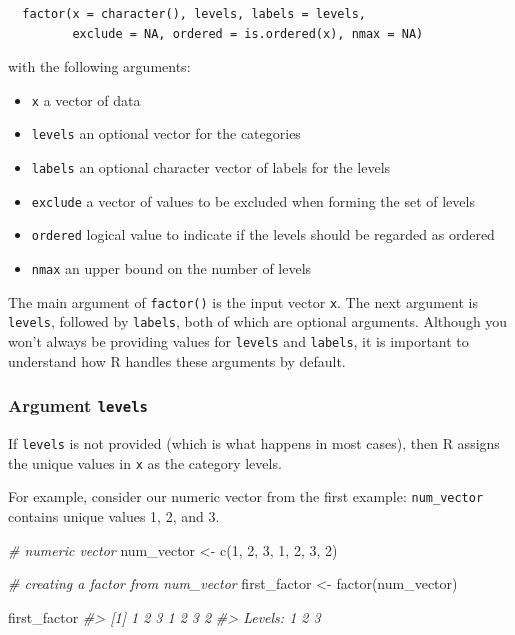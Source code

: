 \documentclass[
]{book}
\newenvironment{Shaded}{\begin{snugshade}}{\end{snugshade}}
\newcommand{\CommentTok}[1]{\textcolor[rgb]{0.56,0.35,0.01}{\textit{#1}}}
\newcommand{\DecValTok}[1]{\textcolor[rgb]{0.00,0.00,0.81}{#1}}
\newcommand{\FunctionTok}[1]{\textcolor[rgb]{0.00,0.00,0.00}{#1}}
\newcommand{\NormalTok}[1]{#1}
\newcommand{\OtherTok}[1]{\textcolor[rgb]{0.56,0.35,0.01}{#1}}
\providecommand{\tightlist}{%
  \setlength{\itemsep}{0pt}\setlength{\parskip}{0pt}}
\begin{document}
\begin{verbatim}
  factor(x = character(), levels, labels = levels,
         exclude = NA, ordered = is.ordered(x), nmax = NA)
\end{verbatim}

with the following arguments:

\begin{itemize}
\tightlist
\item
  \texttt{x} a vector of data
\item
  \texttt{levels} an optional vector for the categories
\item
  \texttt{labels} an optional character vector of labels for the levels
\item
  \texttt{exclude} a vector of values to be excluded when forming the set of levels
\item
  \texttt{ordered} logical value to indicate if the levels should be regarded as ordered
\item
  \texttt{nmax} an upper bound on the number of levels
\end{itemize}

The main argument of \texttt{factor()} is the input vector \texttt{x}. The next argument is
\texttt{levels}, followed by \texttt{labels}, both of which are optional arguments. Although
you won't always be providing values for \texttt{levels} and \texttt{labels}, it is important
to understand how R handles these arguments by default.

\hypertarget{argument-levels}{%
\subsubsection*{\texorpdfstring{Argument \texttt{levels}}{Argument levels}}\label{argument-levels}}

If \texttt{levels} is not provided (which is what happens in most cases), then R
assigns the unique values in \texttt{x} as the category levels.

For example, consider our numeric vector from the first example: \texttt{num\_vector}
contains unique values 1, 2, and 3.

\begin{Shaded}
\begin{Highlighting}[]
\CommentTok{\# numeric vector}
\NormalTok{num\_vector }\OtherTok{\textless{}{-}} \FunctionTok{c}\NormalTok{(}\DecValTok{1}\NormalTok{, }\DecValTok{2}\NormalTok{, }\DecValTok{3}\NormalTok{, }\DecValTok{1}\NormalTok{, }\DecValTok{2}\NormalTok{, }\DecValTok{3}\NormalTok{, }\DecValTok{2}\NormalTok{)}

\CommentTok{\# creating a factor from num\_vector}
\NormalTok{first\_factor }\OtherTok{\textless{}{-}} \FunctionTok{factor}\NormalTok{(num\_vector)}

\NormalTok{first\_factor}
\CommentTok{\#\textgreater{} [1] 1 2 3 1 2 3 2}
\CommentTok{\#\textgreater{} Levels: 1 2 3}
\end{Highlighting}
\end{Shaded}
\end{document}
